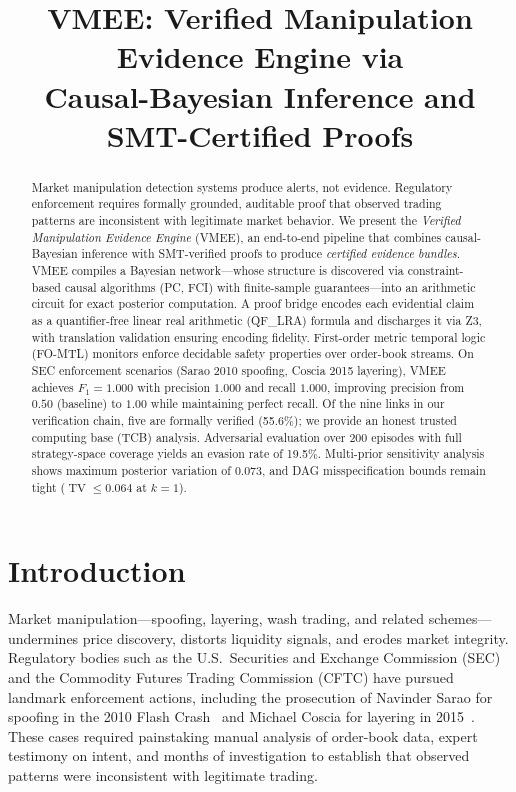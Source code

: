 \documentclass[11pt]{article}
\title{VMEE: Verified Manipulation Evidence Engine via\\Causal-Bayesian Inference and SMT-Certified Proofs}
\date{}
\DeclareMathOperator{\TV}{TV}
\begin{document}
\maketitle

\begin{abstract}
Market manipulation detection systems produce alerts, not evidence.
Regulatory enforcement requires formally grounded, auditable proof that observed trading patterns are inconsistent with legitimate market behavior.
We present the \emph{Verified Manipulation Evidence Engine} (VMEE), an end-to-end pipeline that combines causal-Bayesian inference with SMT-verified proofs to produce \emph{certified evidence bundles}.
VMEE compiles a Bayesian network---whose structure is discovered via constraint-based causal algorithms (PC, FCI) with finite-sample guarantees---into an arithmetic circuit for exact posterior computation.
A proof bridge encodes each evidential claim as a quantifier-free linear real arithmetic (QF\_LRA) formula and discharges it via Z3, with translation validation ensuring encoding fidelity.
First-order metric temporal logic (FO-MTL) monitors enforce decidable safety properties over order-book streams.
On SEC enforcement scenarios (Sarao 2010 spoofing, Coscia 2015 layering), VMEE achieves $F_1 = 1.000$ with precision $1.000$ and recall $1.000$, improving precision from $0.50$ (baseline) to $1.00$ while maintaining perfect recall.
Of the nine links in our verification chain, five are formally verified (55.6\%); we provide an honest trusted computing base (TCB) analysis.
Adversarial evaluation over 200 episodes with full strategy-space coverage yields an evasion rate of 19.5\%.
Multi-prior sensitivity analysis shows maximum posterior variation of 0.073, and DAG misspecification bounds remain tight ($\TV \leq 0.064$ at $k=1$).
\end{abstract}

\section{Introduction}
\label{sec:intro}

Market manipulation---spoofing, layering, wash trading, and related schemes---undermines price discovery, distorts liquidity signals, and erodes market integrity.
Regulatory bodies such as the U.S.\ Securities and Exchange Commission (SEC) and the Commodity Futures Trading Commission (CFTC) have pursued landmark enforcement actions, including the prosecution of Navinder Sarao for spoofing in the 2010 Flash Crash~\cite{cont2010} and Michael Coscia for layering in 2015~\cite{cont2014}.
These cases required painstaking manual analysis of order-book data, expert testimony on intent, and months of investigation to establish that observed patterns were inconsistent with legitimate trading.
\end{document}
